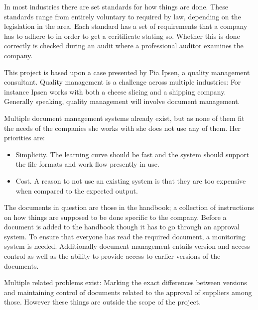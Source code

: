 In most industries there are set standards for how things are done.
These standards range from  entirely voluntary to required by law, depending on the legislation in the area.
Each standard has a set of requirements that a company has to adhere to in order to get a ceritificate stating so.
Whether this is done correctly is checked during an audit where a professional auditor examines the company.

This project is based upon a case presented by Pia Ipsen, a quality management consultant.
Quality management is a challenge across multiple industries: For instance Ipsen works with both a cheese slicing and a shipping company.
Generally speaking, quality management will involve document management.

Multiple document management systems already exist, but as none of them fit the needs of the companies she works with she does not use any of them.
Her priorities are:

\begin{itemize}
\item Simplicity. The learning curve should be fast and the system should support the file formats and work flow presently in use.
\item Cost. A reason to not use an existing system is that they are too expensive when compared to the expected output.
\end{itemize}

The documents in question are those in the handbook; a collection of instructions on how things are supposed to be done specific to the company.
Before a document is added to the handbook though it has to go through an approval system.
To ensure that everyone has read the required document, a monitoring system is needed.
Additionally document management entails version and access control as well as the ability to provide access to earlier versions of the documents.

Multiple related problems exist: Marking the exact differences between versions and maintaining control of documents related to the approval of suppliers among those.
However these things are outside the scope of the project.


